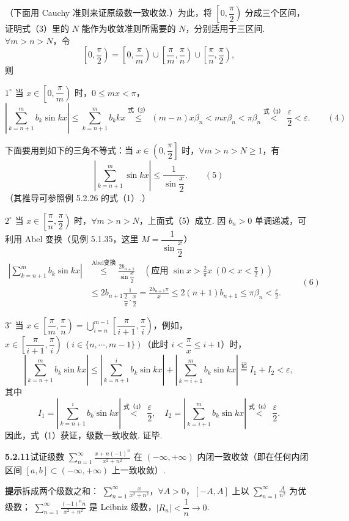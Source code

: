 \documentclass[UTF8, 12pt, fontset=fandol, oneside]{ctexart}
\begin{document}
（下面用 Cauchy 准则来证原级数一致收敛.）为此，将 $\left[0,\dfrac\pi2\right)$ 分成三个区间，证明式（3）里的
$N$ 能作为收敛准则所需要的 $N$，分别适用于三区间. $\forall m>n>N$，令
\[
  \left[0,\frac\pi2\right)=\left[0,\frac\pi m\right)\cup
  \left[\frac\pi m,\frac\pi n\right)\cup
  \left[\frac\pi n,\frac\pi2\right),
\]
则

$1^\circ$ 当 $x\in\left[0,\dfrac\pi m\right)$ 时，$0\le mx<\pi$，
\[
  \left|\sum_{k=n+1}^m b_k\sin kx\right|
  \le\sum_{k=n+1}^m b_kkx
  \overset{\text{式（2）}}{\le}(m-n)x\beta_n
  <mx\beta_n<\pi\beta_n
  \overset{\text{式（3）}}{<}\frac\varepsilon2<\varepsilon.
\qquad(4)
\]

下面要用到如下的三角不等式：当 $x\in\left(0,\dfrac\pi2\right]$ 时，$\forall m>n>N\ge1$，有
\[
  \left|\sum_{k=n+1}^m\sin kx\right|\le\frac1{\sin\dfrac x2}.
\qquad(5)
\]
（其推导可参照例 5.2.26 的式（1）.）

$2^\circ$ 当 $x\in\left[\dfrac\pi n,\dfrac\pi2\right)$ 时，$\forall m>n>N$，上面式（5）成立. 因
$b_n>0$ 单调递减，可利用 Abel 变换（见例 5.1.35，这里 $M=\dfrac1{\sin\dfrac x2}$）
\[
\begin{aligned}
\left|\sum_{k=n+1}^m b_k\sin kx\right|
&\overset{\text{Abel变换}}{\le}\frac{2b_{n+1}}{\sin\dfrac x2}
\quad\left(\text{应用 }\sin x>\frac2\pi x\ (0<x<\frac\pi2)\right)\\
&\le 2b_{n+1}\frac1{\dfrac2\pi\cdot\dfrac x2}
=\frac{2b_{n+1}\pi}{x}
\le2(n+1)b_{n+1}\le\pi\beta_n<\frac\varepsilon2.
\end{aligned}
\qquad(6)
\]

$3^\circ$ 当 $x\in\left[\dfrac\pi m,\dfrac\pi n\right)=
\displaystyle\bigcup_{i=n}^{m-1}\left[\dfrac\pi{i+1},\dfrac\pi i\right)$，例如，
$x\in\left[\dfrac\pi{i+1},\dfrac\pi i\right)\ (i\in\{n,\cdots,m-1\})$（此时
$i<\dfrac\pi x\le i+1$）时，
\[
  \left|\sum_{k=n+1}^{m}b_k\sin kx\right|
  \le\left|\sum_{k=n+1}^{i}b_k\sin kx\right|
  +\left|\sum_{k=i+1}^{m}b_k\sin kx\right|
  \overset{\text{记}}=I_1+I_2<\varepsilon,
\]
其中
\[
  I_1=\left|\sum_{k=n+1}^{i}b_k\sin kx\right|
  \overset{\text{式（4）}}{<}\frac\varepsilon2,\quad
  I_2=\left|\sum_{k=i+1}^{m}b_k\sin kx\right|
  \overset{\text{式（6）}}{<}\frac\varepsilon2.
\]
因此，式（1）获证，级数一致收敛. 证毕.

\noindent\textbf{5.2.11}\quad 试证级数
$\displaystyle\sum_{n=1}^{\infty}\frac{x+n(-1)^n}{x^2+n^2}$ 在 $(-\infty,+\infty)$ 内闭一致收敛（即在任何内闭区间
$[a,b]\subset(-\infty,+\infty)$ 上一致收敛）.

\noindent\textbf{提示}\quad 拆成两个级数之和：
$\displaystyle\sum_{n=1}^{\infty}\frac{x}{x^2+n^2}$，$\forall A>0$，$[-A,A]$ 上以
$\displaystyle\sum_{n=1}^{\infty}\frac A{n^2}$ 为优级数；
$\displaystyle\sum_{n=1}^{\infty}\frac{(-1)^nn}{x^2+n^2}$ 是 Leibniz 级数，$|R_n|<\dfrac1n\to0$.
\end{document}
